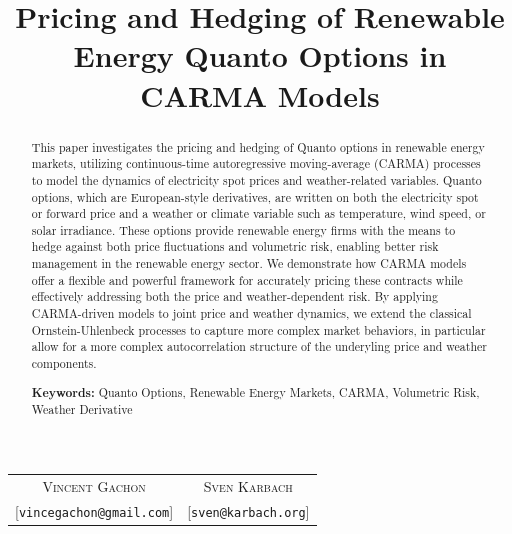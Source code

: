 \documentclass[10pt,a4paper,reqno]{amsart}
\theoremstyle{example}
\begin{document}
\title[Pricing and Hedging of Quantos in CARMA Models]{Pricing and Hedging of
  Renewable Energy Quanto Options in CARMA Models}

\address{Informatics Institute and Korteweg-de Vries Institute for Mathematics at the University of
  Amsterdam, Science Park 105-107, 1098 XG Amsterdam, Netherlands}     

\maketitle
\vspace{-0mm}
\begin{center}
  \begin{tabular}{cc}
    \textsc{Vincent Gachon} & \textsc{Sven Karbach} \\
    \small[\texttt{\MakeLowercase{vincegachon@gmail.com}}] &  \small[\texttt{\MakeLowercase{sven@karbach.org}}] \\
  \end{tabular}
\end{center}


\begin{abstract}
  This paper investigates the pricing and hedging of Quanto options in renewable
  energy markets, utilizing continuous-time autoregressive moving-average
  (CARMA) processes to model the dynamics of electricity spot prices and
  weather-related variables. Quanto options, which are European-style
  derivatives, are written on both the electricity spot or forward price and
  a weather or climate variable such as temperature, wind speed, or solar
  irradiance. These options provide renewable energy firms with the means to
  hedge against both price fluctuations and volumetric risk, enabling better
  risk management in the renewable energy sector. We demonstrate how CARMA models
  offer a flexible and powerful framework for accurately pricing these contracts
  while effectively addressing both the price and weather-dependent risk. By
  applying CARMA-driven models to joint price and weather dynamics, we extend
  the classical Ornstein-Uhlenbeck processes to capture more complex market
  behaviors, in particular allow for a more complex autocorrelation structure of
  the underyling price and weather components.\newline{}
  
  \noindent \textbf{Keywords:} Quanto Options, Renewable Energy Markets, CARMA,
  Volumetric Risk, Weather Derivative
\end{abstract}
\end{document}
